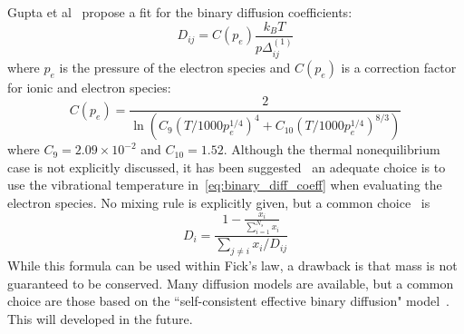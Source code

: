 Gupta et al~\cite{GuptaYosetal1990} propose a fit for the binary diffusion coefficients:
%
\begin{equation}\label{eq:binary_diff_coeff}
D_{ij} = C(p_e)\frac{k_B T}{p \Delta_{ij}^{(1)} }
\end{equation}
%
where $p_e$ is the pressure of the electron species and $C(p_e)$ is a correction factor for ionic and electron species:
%
\begin{equation}
C(p_e) = \frac{2}{\ln \left(  C_9\left(T/1000p_e^{1/4}\right)^4 + C_{10} \left(T/1000p_e^{1/4}\right)^{8/3}    \right)}
\end{equation}
%
where $C_9 = 2.09\times 10^{-2}$ and $C_{10} = 1.52$. Although the thermal nonequilibrium case is not
explicitly discussed, it has been suggested~\cite{Panesi2011} an adequate choice is to use the vibrational temperature
in~\eqref{eq:binary_diff_coeff} when evaluating the electron species. No mixing rule is explicitly given, but a common 
choice~\cite{Ramshaw1990} is
%
\begin{equation}
D_i = \frac{1 - \frac{x_i}{\sum_{i=1}^{N_s}x_i}}{\sum_{j\ne i} x_i/D_{ij}}
\end{equation}
%
While this formula can be used within Fick's law, a drawback is that mass is not guaranteed to be conserved. Many diffusion
models are available, but a common choice are those based on the ``self-consistent effective binary diffusion" 
model~\cite{Ramshaw1990}. This will developed in the future.


